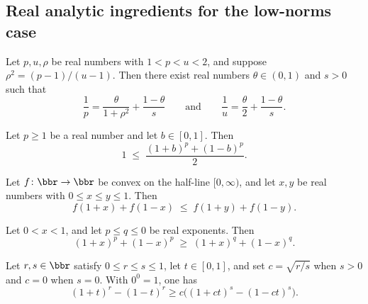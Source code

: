 \subsection{Real analytic ingredients for the low-norms case}

\begin{lemma}
\label{BooleanAnalysis.Hypercontractivity.low_norms_interpolation_params}
\leanok
{}
Let $p, u, \rho$ be real numbers with $1 < p < u < 2$, and suppose $\rho^2 =
(p-1)/(u-1)$. Then there exist real numbers $\theta \in (0,1)$ and $s > 0$ such that
\[
  \frac{1}{p} = \frac{\theta}{1+\rho^2} + \frac{1-\theta}{s}
  \qquad\text{and}\qquad
  \frac{1}{u} = \frac{\theta}{2} + \frac{1-\theta}{s}.
\]
\end{lemma}

\begin{lemma}
\label{BooleanAnalysis.Hypercontractivity.avg_rpow_ge_one}
\leanok
{}
Let $p \ge 1$ be a real number and let $b \in [0,1]$. Then
\[
  1 \;\le\; \frac{(1+b)^p + (1-b)^p}{2}.
\]
\end{lemma}

\begin{lemma}
\label{BooleanAnalysis.Hypercontractivity.convex_sym_sum_mono}
\leanok
{}
Let $f\colon\bbr\to\bbr$ be convex on the half-line $[0,\infty)$, and let $x,y$ be real
numbers with $0 \le x \le y \le 1$. Then
\[
  f(1+x) + f(1-x) \;\le\; f(1+y) + f(1-y).
\]
\end{lemma}

\begin{lemma}
\label{BooleanAnalysis.Hypercontractivity.rpow_sum_antitone_exponent}
\leanok
{}
Let $0 < x < 1$, and let $p \le q \le 0$ be real exponents. Then
\[
  (1+x)^p + (1-x)^p \;\ge\; (1+x)^q + (1-x)^q.
\]
\end{lemma}

\begin{lemma}
\label{BooleanAnalysis.Hypercontractivity.h_alpha_ineq}
\leanok
{}
Let $r,s\in\bbr$ satisfy $0\le r\le s\le1$, let $t\in[0,1]$, and set
$c=\sqrt{r/s}$ when $s>0$ and $c=0$ when $s=0$. With $0^0=1$, one has
\[
  (1+t)^r-(1-t)^r\ge c\bigl((1+ct)^s-(1-ct)^s\bigr).
\]
\end{lemma}

